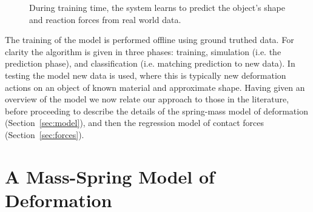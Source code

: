 \documentclass[journal]{IEEEtran}
\newcommand{\alref}[1]{Algorithm~\ref{#1}}
\newcounter{algorithm}
\begin{document}
\begin{figure}[t]
\centering
\setlength\fboxsep{0pt}    %
\setlength\fboxrule{0.5pt} %
\caption{During training time, the system learns to predict the object's shape and reaction forces from real world data.}
\label{fig:system}
\end{figure}

The training of the model is performed offline using ground truthed data. %
For clarity the algorithm is given in three phases: training, simulation (i.e. the prediction phase), and classification (i.e. matching prediction to new data). In testing the model new data is used, where this is typically new deformation actions on an object of known material and approximate shape. Having given an overview of the model we now relate our approach to those in the literature, before proceeding to describe the details of the spring-mass model of deformation (Section~\ref{sec:model}), and then the regression model of contact forces (Section~\ref{sec:forces}).



\section{A Mass-Spring Model of Deformation}
\end{document}
